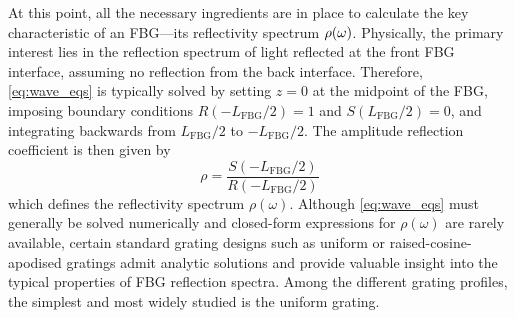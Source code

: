 %
\par
%
At this point, all the necessary ingredients are in place to calculate the key characteristic of an FBG—its reflectivity spectrum $\rho(\omega)$.
Physically, the primary interest lies in the reflection spectrum of light reflected at the front FBG interface, assuming no reflection from the back interface.
Therefore, \eqref{eq:wave_eqs} is typically solved by setting $z = 0$ at the midpoint of the FBG, imposing boundary conditions $R(-L_\text{FBG}/2) = 1$ and $S(L_\text{FBG}/2) = 0$, and integrating backwards from $L_\text{FBG}/2$ to $-L_\text{FBG}/2$. The amplitude reflection coefficient is then given by
%
\begin{equation}
\label{eq:rho}
    \rho = \frac{S(-L_\text{FBG}/2)}{R(-L_\text{FBG}/2)}
\end{equation}
%
which defines the reflectivity spectrum $\rho(\omega)$.
Although \eqref{eq:wave_eqs} must generally be solved numerically and closed-form expressions for $\rho(\omega)$ are rarely available, certain standard grating designs such as uniform or raised-cosine-apodised gratings admit analytic solutions and provide valuable insight into the typical properties of FBG reflection spectra.
Among the different grating profiles, the simplest and most widely studied is the uniform grating.
%
%
